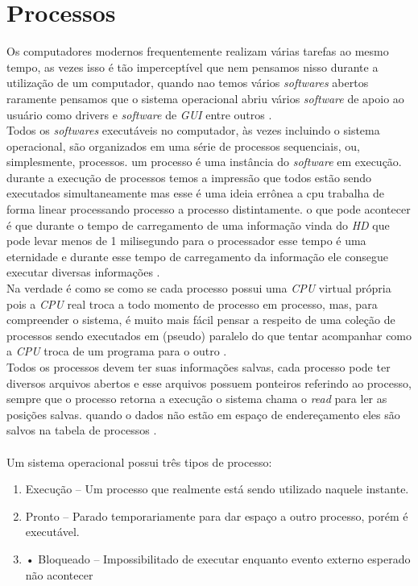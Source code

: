 
\section{Processos}\label{sec:Processos}

Os computadores modernos frequentemente realizam várias tarefas ao mesmo tempo, as vezes isso é tão imperceptível que nem pensamos nisso durante a utilização de um computador, quando nao temos vários \emph{softwares} abertos raramente pensamos que o sistema operacional abriu vários \emph{software} de apoio ao usuário como drivers e \emph{software} de \emph{GUI} entre outros \cite{Tanenbaum2016}.\\
Todos os \emph{softwares} executáveis no computador, às vezes incluindo o sistema operacional, são organizados em uma série de processos sequenciais, ou, simplesmente, processos. um processo é uma instância do \emph{software} em execução.  durante a execução de processos temos a impressão que todos estão sendo executados simultaneamente mas esse é uma ideia errônea a cpu trabalha de forma linear processando processo a processo distintamente. o que pode acontecer é que durante o tempo de carregamento de uma informação vinda do \emph{HD} que pode levar menos de 1 milisegundo para o processador esse tempo é uma eternidade e durante esse tempo de carregamento da informação ele consegue executar diversas informações \cite{Tanenbaum2016}.\\
Na verdade é como se como se cada processo possui  uma \emph{CPU} virtual própria  pois a \emph{CPU} real troca a todo momento de processo em processo, mas, para compreender o sistema, é muito mais fácil pensar a respeito de uma coleção de processos sendo executados em (pseudo) paralelo do que tentar acompanhar como a \emph{CPU} troca de um programa para o outro \cite{Tanenbaum2016}.\\
Todos os processos devem ter suas informações salvas, cada processo pode ter diversos arquivos abertos e esse arquivos possuem ponteiros referindo ao processo, sempre que o processo retorna a execução o sistema chama o \emph{read} para ler as posições salvas. quando o dados não estão em espaço de endereçamento eles são salvos na tabela de processos \cite{Tanenbaum2016}.\\
\\Um sistema operacional possui três tipos de processo:
    \begin{enumerate}
        \item Execução – Um processo que realmente está sendo utilizado naquele
        instante.
        \item Pronto – Parado temporariamente para dar espaço a outro processo,
        porém é executável.
        \item • Bloqueado – Impossibilitado de executar enquanto evento externo
        esperado não acontecer
    \end{enumerate}

